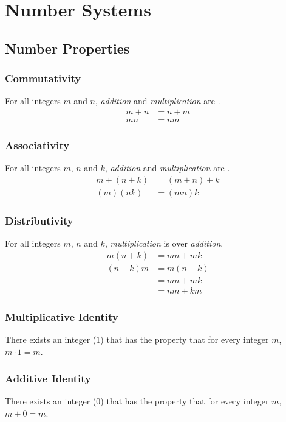 \documentclass[../notes.tex]{subfiles}
\begin{document}
	\chapter{Number Systems}
		\section{Number Properties}
			\subsection{Commutativity}
				For all integers $m$ and $n$, \emph{addition} and \emph{multiplication} are .
				\nopagebreak
				\begin{align*}
					m + n &= n + m \tag*{addition}\\
					mn &= nm \tag*{multiplication}
				\end{align*}
			\subsection{Associativity}
				For all integers $m$, $n$ and $k$, \emph{addition} and \emph{multiplication} are .
				\nopagebreak
				\begin{align*}
					m+(n+k) &= (m+n)+k \tag*{addition}\\
					(m)(nk) &= (mn)k \tag*{multiplication}
				\end{align*}
			\subsection{Distributivity}
				For all integers $m$, $n$ and $k$, \emph{multiplication} is  over \emph{addition}.
				\nopagebreak
				\begin{align*}
					m(n + k) &= mn + mk\\
					(n + k)m &= m(n + k)\\
					&= mn + mk\\
					&= nm + km
				\end{align*}
			\subsection{Multiplicative Identity}
				There exists an integer ($1$) that has the property that for every integer $m$, $m\cdot 1 = m$.
			\subsection{Additive Identity}
				There exists an integer ($0$) that has the property that for every integer $m$, $m + 0 = m$.
\end{document}
